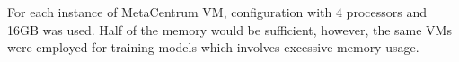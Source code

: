 For each instance of MetaCentrum VM, configuration with 4 processors and 16GB was used.
Half of the memory would be sufficient, however, the same VMs were employed for training models which involves excessive memory usage.




